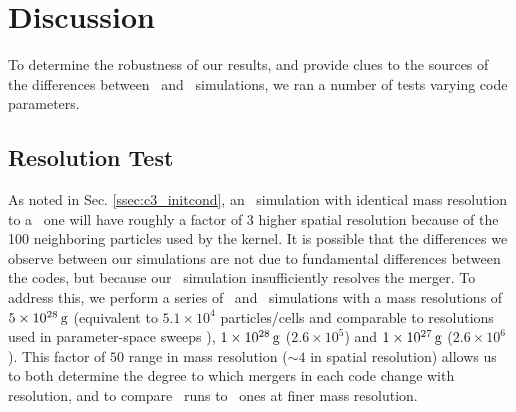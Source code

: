 \section{Discussion}
\label{sec:c3_discussion}

To determine the robustness of our results, and provide clues to the sources of the differences between \arepo\ and \gasoline\ simulations, we ran a number of tests varying code parameters.

\subsection{Resolution Test}
\label{ssec:c3_restest}


As noted in Sec. \ref{ssec:c3_initcond}, an \arepo\ simulation with identical mass resolution to a \gasoline\ one will have roughly a factor of {\charles $3$} higher spatial resolution because of the 100 neighboring particles used by the kernel.  It is possible that the differences we observe between our simulations are not due to fundamental differences between the codes, but because our \gasoline\ simulation insufficiently resolves the merger.  To address this, we perform a series of \gasoline\ and \arepo\ simulations with a mass resolutions of $5\times10^{28}\,\mathrm{g}$ (equivalent to $5.1\times10^4$ particles/cells and comparable to resolutions used in parameter-space sweeps \citealt{dan+12,dan+14}), $1\times10^{28}\,\mathrm{g}$ ($2.6\times10^{5}$) and $1\times10^{27}\,\mathrm{g}$ ($2.6\times10^{6}$).  This factor of $50$ range in mass resolution ($\sim4$ in spatial resolution) allows us to both determine the degree to which mergers in each code change with resolution, and to compare \arepo\ runs to \gasoline\ ones at finer mass resolution.

